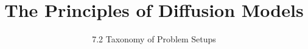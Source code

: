 
\title{The Principles of Diffusion Models}
\subtitle{7.2 Taxonomy of Problem Setups}


\begin{frame}
    \titlepage
\end{frame}


